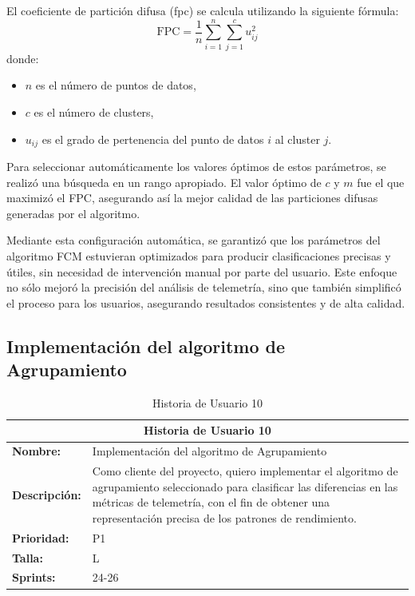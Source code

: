 El coeficiente de partición difusa (\ac{fpc}) se calcula utilizando la siguiente fórmula:
\[
\text{FPC} = \frac{1}{n} \sum_{i=1}^{n} \sum_{j=1}^{c} u_{ij}^2
\]
donde:
\begin{itemize}
    \item \( n \) es el número de puntos de datos,
    \item \( c \) es el número de clusters,
    \item \( u_{ij} \) es el grado de pertenencia del punto de datos \( i \) al cluster \( j \).
\end{itemize}


Para seleccionar automáticamente los valores óptimos de estos parámetros, se realizó una búsqueda en un rango apropiado. El valor óptimo de $c$ y $m$ fue el que maximizó el FPC, asegurando así la mejor calidad de las particiones difusas generadas por el algoritmo.

Mediante esta configuración automática, se garantizó que los parámetros del algoritmo FCM estuvieran optimizados para producir clasificaciones precisas y útiles, sin necesidad de intervención manual por parte del usuario. Este enfoque no sólo mejoró la precisión del análisis de telemetría, sino que también simplificó el proceso para los usuarios, asegurando resultados consistentes y de alta calidad.

\subsection{Implementación del algoritmo de Agrupamiento}
\begin{table}[H]
\centering
\begin{tabular}{|l|p{10cm}|}
\hline
\multicolumn{2}{|c|}{\textbf{Historia de Usuario 10}} \\ \hline
\textbf{Nombre:} &  Implementación del algoritmo de Agrupamiento \\ \hline
\textbf{Descripción:} & Como cliente del proyecto, quiero implementar el algoritmo de agrupamiento seleccionado para clasificar las diferencias en las métricas de telemetría, con el fin de obtener una representación precisa de los patrones de rendimiento.  \\ \hline
\textbf{Prioridad:} & P1 \\ \hline
\textbf{Talla:} & L \\ \hline
\textbf{Sprints:} & 24-26 \\ \hline
\end{tabular}
\caption{Historia de Usuario 10}
\label{tab:implementar_algoritmos_agrupamiento}
\end{table}

